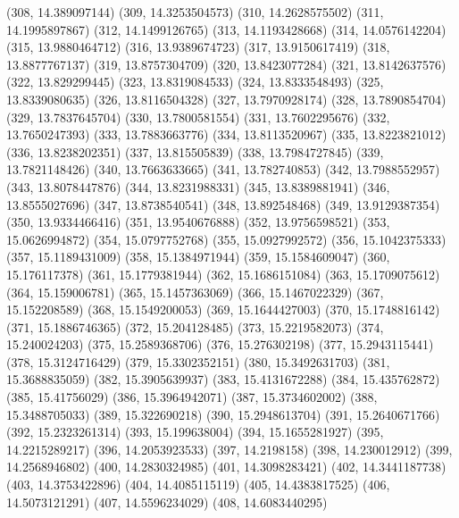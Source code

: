 {					(308, 14.389097144)
					(309, 14.3253504573)
					(310, 14.2628575502)
					(311, 14.1995897867)
					(312, 14.1499126765)
					(313, 14.1193428668)
					(314, 14.0576142204)
					(315, 13.9880464712)
					(316, 13.9389674723)
					(317, 13.9150617419)
					(318, 13.8877767137)
					(319, 13.8757304709)
					(320, 13.8423077284)
					(321, 13.8142637576)
					(322, 13.829299445)
					(323, 13.8319084533)
					(324, 13.8333548493)
					(325, 13.8339080635)
					(326, 13.8116504328)
					(327, 13.7970928174)
					(328, 13.7890854704)
					(329, 13.7837645704)
					(330, 13.7800581554)
					(331, 13.7602295676)
					(332, 13.7650247393)
					(333, 13.7883663776)
					(334, 13.8113520967)
					(335, 13.8223821012)
					(336, 13.8238202351)
					(337, 13.815505839)
					(338, 13.7984727845)
					(339, 13.7821148426)
					(340, 13.7663633665)
					(341, 13.782740853)
					(342, 13.7988552957)
					(343, 13.8078447876)
					(344, 13.8231988331)
					(345, 13.8389881941)
					(346, 13.8555027696)
					(347, 13.8738540541)
					(348, 13.892548468)
					(349, 13.9129387354)
					(350, 13.9334466416)
					(351, 13.9540676888)
					(352, 13.9756598521)
					(353, 15.0626994872)
					(354, 15.0797752768)
					(355, 15.0927992572)
					(356, 15.1042375333)
					(357, 15.1189431009)
					(358, 15.1384971944)
					(359, 15.1584609047)
					(360, 15.176117378)
					(361, 15.1779381944)
					(362, 15.1686151084)
					(363, 15.1709075612)
					(364, 15.159006781)
					(365, 15.1457363069)
					(366, 15.1467022329)
					(367, 15.152208589)
					(368, 15.1549200053)
					(369, 15.1644427003)
					(370, 15.1748816142)
					(371, 15.1886746365)
					(372, 15.204128485)
					(373, 15.2219582073)
					(374, 15.240024203)
					(375, 15.2589368706)
					(376, 15.276302198)
					(377, 15.2943115441)
					(378, 15.3124716429)
					(379, 15.3302352151)
					(380, 15.3492631703)
					(381, 15.3688835059)
					(382, 15.3905639937)
					(383, 15.4131672288)
					(384, 15.435762872)
					(385, 15.41756029)
					(386, 15.3964942071)
					(387, 15.3734602002)
					(388, 15.3488705033)
					(389, 15.322690218)
					(390, 15.2948613704)
					(391, 15.2640671766)
					(392, 15.2323261314)
					(393, 15.199638004)
					(394, 15.1655281927)
					(395, 14.2215289217)
					(396, 14.2053923533)
					(397, 14.2198158)
					(398, 14.230012912)
					(399, 14.2568946802)
					(400, 14.2830324985)
					(401, 14.3098283421)
					(402, 14.3441187738)
					(403, 14.3753422896)
					(404, 14.4085115119)
					(405, 14.4383817525)
					(406, 14.5073121291)
					(407, 14.5596234029)
					(408, 14.6083440295)
}
